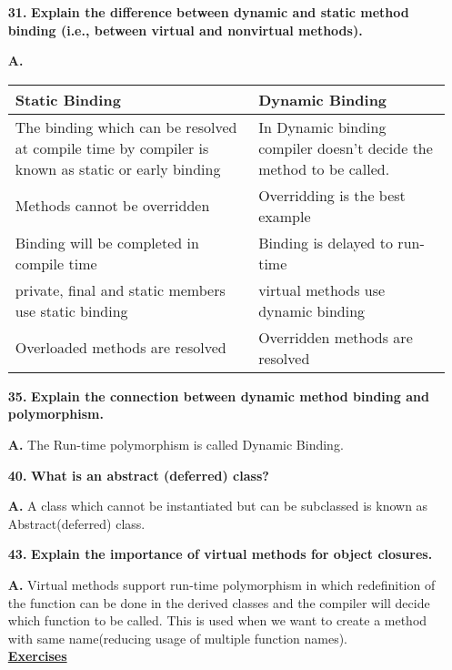 \documentclass[letterpaper]{article}
\begin{document}
\begin{large}
\begin{flushleft}
\begin{enumerate}
\item[\textbf{31.}]
\textbf{Explain the difference between dynamic and static method binding (i.e., between virtual and nonvirtual methods).}
\item[\textbf{A.}]
\begin{tabular}{| m{8.55cm} | m{8.55cm} |}
\hline
\textbf{Static Binding} & \textbf{Dynamic Binding}\\
\hline
The binding which can be resolved at compile time by compiler is known as static or early binding & In Dynamic binding compiler doesn’t decide the method to be called.\\
\hline
Methods cannot be overridden & Overridding is the best example\\
\hline
Binding will be completed in compile time & Binding is delayed to run-time\\
\hline
private,  final and static members use static binding & virtual methods use dynamic binding\\
\hline
Overloaded methods are resolved & Overridden methods are resolved\\
\hline
\end{tabular}

\item[\textbf{35.}]
\textbf{Explain the connection between dynamic method binding and polymorphism.}
\item[\textbf{A.}]
The Run-time polymorphism is called Dynamic Binding.

\item[\textbf{40.}]
\textbf{What is an abstract (deferred) class?}
\item[\textbf{A.}]
A class which cannot be instantiated but can be subclassed is known as Abstract(deferred) class.

\item[\textbf{43.}]
\textbf{Explain the importance of virtual methods for object closures.}
\item[\textbf{A.}]
Virtual methods support run-time polymorphism in which redefinition of the function can be done in the derived classes and the compiler will decide which function to be called. This is used when we want to create a method with same name(reducing usage of multiple function names).\\[0.2in] 

\textbf{\underline{Exercises }}\\[0.2in]


\end{enumerate}
\end{flushleft}
\end{large}
\end{document}
